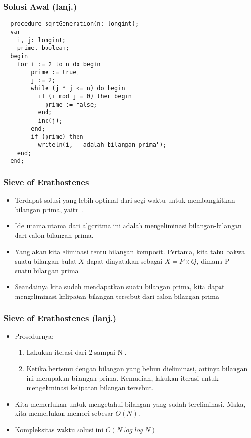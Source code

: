 \begin{frame}[fragile]
\frametitle{Solusi Awal (lanj.)}
  \begin{lstlisting}
  procedure sqrtGeneration(n: longint);
  var
    i, j: longint;
    prime: boolean;
  begin
    for i := 2 to n do begin
        prime := true;
        j := 2;
        while (j * j <= n) do begin
          if (i mod j = 0) then begin
            prime := false;
          end;
          inc(j);
        end;
        if (prime) then
          writeln(i, ' adalah bilangan prima');
    end;
  end;  
  \end{lstlisting}
\end{frame}

\begin{frame}
\frametitle{Sieve of Erathostenes}
\begin{itemize}
  \item Terdapat solusi yang lebih optimal dari segi waktu untuk membangkitkan bilangan prima, yaitu .
  \item Ide utama utama dari algoritma ini adalah mengeliminasi bilangan-bilangan dari calon bilangan prima.
  \item Yang akan kita eliminasi tentu bilangan komposit. Pertama, kita tahu bahwa suatu bilangan bulat $X$ dapat dinyatakan sebagai $X = P \times Q$, dimana P suatu bilangan prima.
  \item Seandainya kita sudah mendapatkan suatu bilangan prima, kita dapat mengeliminasi kelipatan bilangan tersebut dari calon bilangan prima.
\end{itemize}
\end{frame}

\begin{frame}
\frametitle{Sieve of Erathostenes (lanj.)}
\begin{itemize}
  \item Prosedurnya:
  \begin{enumerate}
    \item Lakukan iterasi dari 2 sampai N .
    \item Ketika bertemu dengan bilangan yang belum dieliminasi, artinya bilangan ini merupakan bilangan prima. Kemudian, lakukan iterasi untuk mengeliminasi kelipatan bilangan tersebut.
  \end{enumerate}
  \item Kita memerlukan  untuk mengetahui bilangan yang sudah tereliminasi. Maka, kita memerlukan memori sebesar $O(N)$.
  \item Kompleksitas waktu solusi ini $O(N\;log\;log\;N)$.
\end{itemize}
\end{frame}

